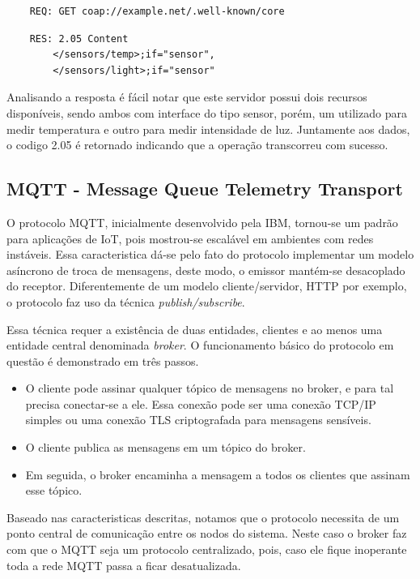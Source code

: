 \begin{verbatim}
    REQ: GET coap://example.net/.well-known/core
\end{verbatim}

\begin{verbatim}
    RES: 2.05 Content
        </sensors/temp>;if="sensor",
        </sensors/light>;if="sensor"
\end{verbatim}


Analisando a resposta é fácil notar que este servidor possui dois recursos disponíveis,
sendo ambos com interface do tipo sensor, porém, um utilizado para medir temperatura e outro para medir intensidade de luz.
Juntamente aos dados, o codigo 2.05 é retornado indicando que a operação transcorreu com sucesso.

\subsection{MQTT - Message Queue Telemetry Transport}

O protocolo MQTT, inicialmente desenvolvido pela IBM, tornou-se um padrão para aplicações de IoT, pois mostrou-se escalável em ambientes com redes instáveis.
Essa caracteristica dá-se pelo fato do protocolo implementar um modelo asíncrono de troca de mensagens, deste modo, o emissor mantém-se desacoplado do receptor.
Diferentemente de um modelo cliente/servidor, HTTP por exemplo, o protocolo faz uso da técnica \textit{publish/subscribe}.


Essa técnica requer a existência de duas entidades, clientes e ao menos uma entidade central denominada \textit{broker}.
O funcionamento básico do protocolo em questão é demonstrado em três passos.

\begin{itemize}
    \item O cliente pode assinar qualquer tópico de mensagens no broker, e para tal precisa conectar-se a ele. Essa conexão pode ser uma conexão TCP/IP simples ou uma conexão TLS criptografada para mensagens sensíveis.
    \item O cliente publica as mensagens em um tópico do broker.
    \item Em seguida, o broker encaminha a mensagem a todos os clientes que assinam esse tópico.
\end{itemize}

Baseado nas caracteristicas descritas, notamos que o protocolo necessita de um ponto central de comunicação entre os nodos do sistema.
Neste caso o broker faz com que o MQTT seja um protocolo centralizado, pois, caso ele fique inoperante toda a rede MQTT passa a ficar desatualizada.

